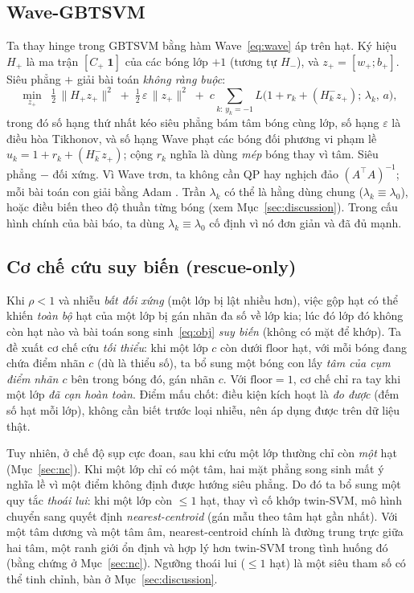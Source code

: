 \documentclass[11pt,a4paper]{article}
\begin{document}
\subsection{Wave-GBTSVM}
\label{sec:wavegb}
Ta thay hinge trong GBTSVM bằng hàm Wave~\eqref{eq:wave} áp trên hạt. Ký hiệu $H_+$ là ma trận $[C_+\;\mathbf{1}]$ của các bóng lớp $+1$ (tương tự $H_-$), và $z_+=[w_+;b_+]$. Siêu phẳng $+$ giải bài toán \emph{không ràng buộc}:
\begin{equation}
\label{eq:obj}
\min_{z_+}\;\; \tfrac{1}{2}\,\|H_+ z_+\|^2 \;+\; \tfrac{1}{2}\,\varepsilon\,\|z_+\|^2 \;+\; c\!\!\sum_{k:\,y_k=-1}\!\! L\!\big(1 + r_k + (H_k^{-} z_+);\,\lambda_k,\,a\big),
\end{equation}
trong đó số hạng thứ nhất kéo siêu phẳng bám tâm bóng cùng lớp, số hạng $\varepsilon$ là điều hòa Tikhonov, và số hạng Wave phạt các bóng đối phương vi phạm lề $u_k = 1 + r_k + (H_k^{-}z_+)$; cộng $r_k$ nghĩa là dùng \emph{mép} bóng thay vì tâm. Siêu phẳng $-$ đối xứng. Vì Wave trơn, ta không cần QP hay nghịch đảo $(A^\top A)^{-1}$; mỗi bài toán con giải bằng Adam \cite{adam2015}. Trần $\lambda_k$ có thể là hằng dùng chung ($\lambda_k\equiv\lambda_0$), hoặc điều biến theo độ thuần từng bóng (xem Mục~\ref{sec:discussion}). Trong cấu hình chính của bài báo, ta dùng $\lambda_k\equiv\lambda_0$ cố định vì nó đơn giản và đã đủ mạnh.

\subsection{Cơ chế cứu suy biến (rescue-only)}
\label{sec:rescue}
Khi $\rho<1$ và nhiễu \emph{bất đối xứng} (một lớp bị lật nhiều hơn), việc gộp hạt có thể khiến \emph{toàn bộ} hạt của một lớp bị gán nhãn đa số về lớp kia; lúc đó lớp đó không còn hạt nào và bài toán song sinh~\eqref{eq:obj} \emph{suy biến} (không có mặt để khớp). Ta đề xuất cơ chế cứu \emph{tối thiểu}: khi một lớp $c$ còn dưới $\text{floor}$ hạt, với mỗi bóng đang chứa điểm nhãn $c$ (dù là thiểu số), ta bổ sung một bóng con lấy \emph{tâm của cụm điểm nhãn $c$} bên trong bóng đó, gán nhãn $c$. Với $\text{floor}=1$, cơ chế chỉ ra tay khi một lớp \emph{đã cạn hoàn toàn}. Điểm mấu chốt: điều kiện kích hoạt là \emph{đo được} (đếm số hạt mỗi lớp), không cần biết trước loại nhiễu, nên áp dụng được trên dữ liệu thật.

Tuy nhiên, ở chế độ sụp cực đoan, sau khi cứu một lớp thường chỉ còn \emph{một} hạt (Mục~\ref{sec:nc}). Khi một lớp chỉ có một tâm, hai mặt phẳng song sinh mất ý nghĩa lề vì một điểm không định được hướng siêu phẳng. Do đó ta bổ sung một quy tắc \emph{thoái lui}: khi một lớp còn $\le 1$ hạt, thay vì cố khớp twin-SVM, mô hình chuyển sang quyết định \emph{nearest-centroid} (gán mẫu theo tâm hạt gần nhất). Với một tâm dương và một tâm âm, nearest-centroid chính là đường trung trực giữa hai tâm, một ranh giới ổn định và hợp lý hơn twin-SVM trong tình huống đó (bằng chứng ở Mục~\ref{sec:nc}). Ngưỡng thoái lui ($\le 1$ hạt) là một siêu tham số có thể tinh chỉnh, bàn ở Mục~\ref{sec:discussion}.
\end{document}

